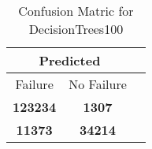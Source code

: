 \begin{table}[] 
\caption{Confusion Matric for DecisionTrees100} 
\label{Table: Prediction Accuracy-DMDDecisionTrees100OnlySunEKF-resetReflectionEKF-top2perfectNoFailurePrediction-Reflection} 
\centering 
\begin{tabular} 
 {@{}ccc@{}} 
\toprule 
\multicolumn{2}{c}{\textbf{Predicted}}
 \\ \midrule 
\multicolumn{1}{|c|}{Failure} & 
\multicolumn{1}{c|}{No Failure}
 \\ \midrule 
\multicolumn{1}{|c|}{\color{green}\textbf{123234}} & 
\multicolumn{1}{c|}{\color{red}\textbf{1307}}
 \\ \midrule 
\multicolumn{1}{|c|}{\color{red}\textbf{11373}} & 
\multicolumn{1}{c|}{\color{green}\textbf{34214}}
 \\ \bottomrule 
\end{tabular} 
\end{table} 
